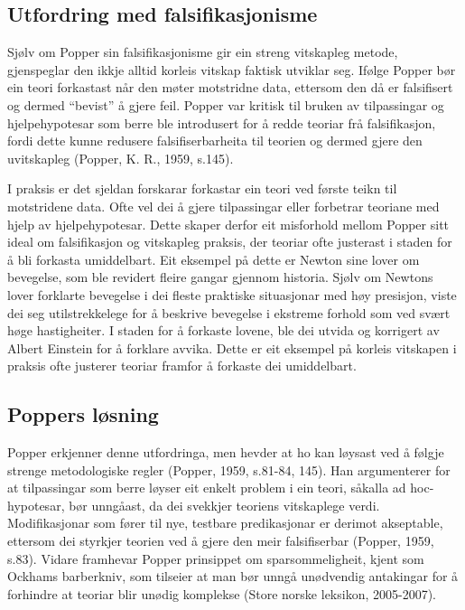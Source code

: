 \documentclass[
  letterpaper,
  DIV=11,
  numbers=noendperiod]{scrreprt}
\begin{document}
\subsection{Utfordring med
falsifikasjonisme}\label{utfordring-med-falsifikasjonisme}

Sjølv om Popper sin falsifikasjonisme gir ein streng vitskapleg metode,
gjenspeglar den ikkje alltid korleis vitskap faktisk utviklar seg.
Ifølge Popper bør ein teori forkastast når den møter motstridne data,
ettersom den då er falsifisert og dermed ``bevist'' å gjere feil. Popper
var kritisk til bruken av tilpassingar og hjelpehypotesar som berre ble
introdusert for å redde teoriar frå falsifikasjon, fordi dette kunne
redusere falsifiserbarheita til teorien og dermed gjere den uvitskapleg
(Popper, K. R., 1959, s.145).

I praksis er det sjeldan forskarar forkastar ein teori ved første teikn
til motstridene data. Ofte vel dei å gjere tilpassingar eller forbetrar
teoriane med hjelp av hjelpehypotesar. Dette skaper derfor eit
misforhold mellom Popper sitt ideal om falsifikasjon og vitskapleg
praksis, der teoriar ofte justerast i staden for å bli forkasta
umiddelbart. Eit eksempel på dette er Newton sine lover om bevegelse,
som ble revidert fleire gangar gjennom historia. Sjølv om Newtons lover
forklarte bevegelse i dei fleste praktiske situasjonar med høy
presisjon, viste dei seg utilstrekkelege for å beskrive bevegelse i
ekstreme forhold som ved svært høge hastigheiter. I staden for å
forkaste lovene, ble dei utvida og korrigert av Albert Einstein for å
forklare avvika. Dette er eit eksempel på korleis vitskapen i praksis
ofte justerer teoriar framfor å forkaste dei umiddelbart.

\subsection{Poppers løsning}\label{poppers-luxf8sning}

Popper erkjenner denne utfordringa, men hevder at ho kan løysast ved å
følgje strenge metodologiske regler (Popper, 1959, s.81-84, 145). Han
argumenterer for at tilpassingar som berre løyser eit enkelt problem i
ein teori, såkalla ad hoc-hypotesar, bør unngåast, da dei svekkjer
teoriens vitskaplege verdi. Modifikasjonar som fører til nye, testbare
predikasjonar er derimot akseptable, ettersom dei styrkjer teorien ved å
gjere den meir falsifiserbar (Popper, 1959, s.83). Vidare framhevar
Popper prinsippet om sparsommeligheit, kjent som Ockhams barberkniv, som
tilseier at man bør unngå unødvendig antakingar for å forhindre at
teoriar blir unødig komplekse (Store norske leksikon, 2005-2007).
\end{document}
